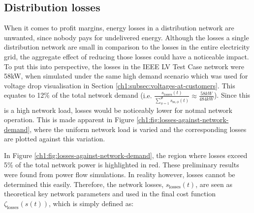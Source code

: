 \subsection{Distribution losses}
\label{ch1:subsec:losses}

When it comes to profit margins, energy losses in a distribution network are unwanted, since nobody pays for undelivered energy.
Although the losses a single distribution network are small in comparison to the losses in the entire electricity grid, the aggregate effect of reducing those losses could have a noticeable impact.
To put this into perspective, the losses in the IEEE LV Test Case network were 58kW, when simulated under the same high demand scenario which was used for voltage drop visualisation in Section \ref{ch1:subsec:voltages-at-customers}.
This equates to 12\% of the total network demand ($\text{i.e. }\frac{s_\text{losses}(t)}{\sum_{\phi=1}^\Phi{s_{\text{ss},\phi}(t)}} \approx \frac{58kW}{484kW}$).
Since this is a high network load, losses would be noticeably lower for notmal network operation.
This is made apparent in Figure \ref{ch1:fig:losses-against-network-demand}, where the uniform network load is varied and the corresponding losses are plotted against this variation.




In Figure \ref{ch1:fig:losses-against-network-demand}, the region where losses exceed 5\% of the total network power is highlighted in red.
These preliminary results were found from power flow simulations.
In reality however, losses cannot be determined this easily.
Therefore, the network losses, $s_\text{losses}(t)$, are seen as theoretical key network parameters and used in the final cost function $\zeta_\text{losses}(s(t))$, which is simply defined as:



